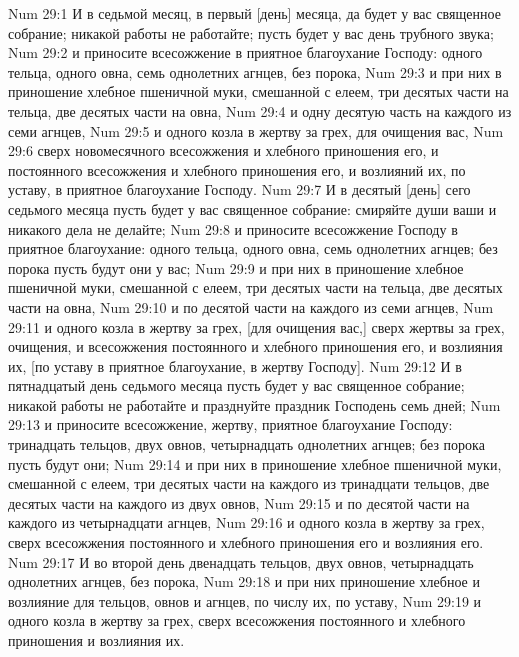 \vs Num 29:1 И в седьмой месяц, в первый [день] месяца, да будет у вас священное собрание; никакой работы не работайте; пусть будет  у вас день трубного звука;
\vs Num 29:2 и приносите всесожжение в приятное благоухание Господу: одного тельца, одного овна, семь однолетних агнцев, без порока,
\vs Num 29:3 и при них в приношение хлебное пшеничной муки, смешанной с елеем, три десятых части  на тельца, две десятых части  на овна,
\vs Num 29:4 и одну десятую часть  на каждого из семи агнцев,
\vs Num 29:5 и одного козла в жертву за грех, для очищения вас,
\vs Num 29:6 сверх новомесячного всесожжения и хлебного приношения его, и  постоянного всесожжения и хлебного приношения его, и возлияний их, по уставу, в приятное благоухание Господу.
\vs Num 29:7 И в десятый [день] сего седьмого месяца пусть будет у вас священное собрание: смиряйте  души ваши и никакого дела не делайте;
\vs Num 29:8 и приносите всесожжение Господу в приятное благоухание: одного тельца, одного овна, семь однолетних агнцев; без порока пусть будут они у вас;
\vs Num 29:9 и при них в приношение хлебное пшеничной муки, смешанной с елеем, три десятых части  на тельца, две десятых части  на овна,
\vs Num 29:10 и по десятой части  на каждого из семи агнцев,
\vs Num 29:11 и одного козла в жертву за грех, [для очищения вас,] сверх жертвы за грех,  очищения, и  всесожжения постоянного и хлебного приношения его, и возлияния их, [по уставу  в приятное благоухание, в жертву Господу].
\vs Num 29:12 И в пятнадцатый день седьмого месяца пусть будет у вас священное собрание; никакой работы не работайте и празднуйте праздник Господень семь дней;
\vs Num 29:13 и приносите всесожжение, жертву, приятное благоухание Господу: тринадцать тельцов, двух овнов, четырнадцать однолетних агнцев; без порока пусть будут они;
\vs Num 29:14 и при них в приношение хлебное пшеничной муки, смешанной с елеем, три десятых части  на каждого из тринадцати тельцов, две десятых части  на каждого из двух овнов,
\vs Num 29:15 и по десятой части  на каждого из четырнадцати агнцев,
\vs Num 29:16 и одного козла в жертву за грех, сверх всесожжения постоянного и хлебного приношения его и возлияния его.
\vs Num 29:17 И во второй день двенадцать тельцов, двух овнов, четырнадцать однолетних агнцев, без порока,
\vs Num 29:18 и при них приношение хлебное и возлияние для тельцов, овнов и агнцев, по числу их, по уставу,
\vs Num 29:19 и одного козла в жертву за грех, сверх всесожжения постоянного и хлебного приношения и возлияния их.

